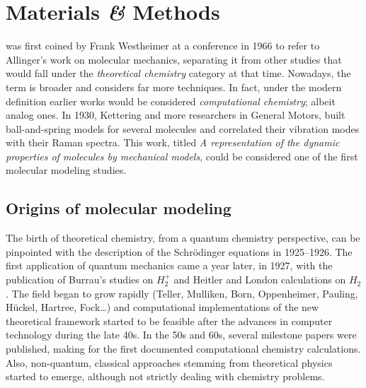 

\chapter{Materials \textit{\&} Methods}
\label{chap:02}

 was first coined by Frank Westheimer at a conference in 1966 to refer to Allinger's work on molecular mechanics,\cite{Lipkowitz_2000} separating it from other studies that would fall under the \textit{theoretical chemistry} category at that time. Nowadays, the term is broader and considers far more techniques. In fact, under the modern definition earlier works would be considered \textit{computational chemistry}; albeit analog ones. In 1930, Kettering and more researchers in General Motors, built ball-and-spring models for several molecules and correlated their vibration modes with their Raman spectra. This work, titled \textit{A representation of the dynamic properties of molecules by mechanical models},\cite{kettering1930} could be considered one of the first molecular modeling studies.

\section{Origins of molecular modeling}
The birth of theoretical chemistry, from a quantum chemistry perspective, can be pinpointed with the description of the Schrödinger equations in 1925--1926.\cite{schrodinger} The first application of quantum mechanics came a year later, in 1927, with the publication of Burrau's studies\cite{burrau1927} on $H_{2}^{+}$ and Heitler and London calculations\cite{heitlerlondon} on $H_{2}$. The field began to grow rapidly (Teller,\cite{teller1930hydrogen} Mulliken,\cite{mulliken} Born,\cite{born} Oppenheimer,\cite{Oppenheimer} Pauling,\cite{pauling} Hückel,\cite{huckel} Hartree,\cite{hartree} Fock\cite{fock}\ldots) and computational implementations of the new theoretical framework started to be feasible after the advances in computer technology during the late 40s.\cite{chistory1940} In the 50s and 60s, several milestone papers were published, making for the first documented computational chemistry calculations.\cite{bolcer2007,ccl} Also, non-quantum, classical approaches stemming from theoretical physics started to emerge, although not strictly dealing with chemistry problems.\cite{Alder1959,Gibson1960,Rahman1964}

